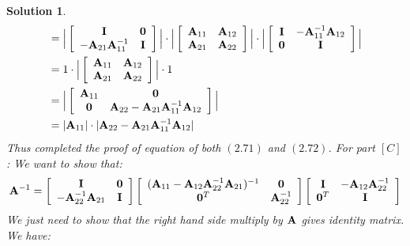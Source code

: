 \documentclass[11pt]{article}
\newtheorem{sol}{Solution}
\begin{document}
\begin{sol}
\begin{align*}
		&= \Big|\left[\begin{array}{cc} {\bf I}& {\bf 0}\\ -{\bf A}_{21}{\bf A}_{11}^{-1}& {\bf I}\end{array}\right]\Big|\cdot \Big|\left[\begin{array}{cc} {\bf A}_{11}& {\bf A}_{12}\\ {\bf A}_{21}&{\bf A}_{22} \end{array}\right]\Big|\cdot \Big|\left[\begin{array}{cc} {\bf I}& -{\bf A}_{11}^{-1}{\bf A}_{12}\\ {\bf 0}& {\bf I}\end{array}\right]\Big|\\
		&= 1\cdot \Big|\left[\begin{array}{cc} {\bf A}_{11}& {\bf A}_{12}\\ {\bf A}_{21}&{\bf A}_{22} \end{array}\right]\Big|\cdot 1\\
		&= \Big| \left[\begin{array}{cc}{\bf A}_{11}& {\bf 0}\\ {\bf 0}& {\bf A}_{22} - {\bf A}_{21}{\bf A}_{11}^{-1}{\bf A}_{12}\end{array}\right]\Big|\\
		&= |{\bf A}_{11}|\cdot |{\bf A}_{22} - {\bf A}_{21}{\bf A}_{11}^{-1}{\bf A}_{12}|
	\end{align*}
	Thus completed the proof of equation of both $(2.71)$ and $(2.72)$.\vskip 2mm
	For part $[C]$:\vskip 2mm
	We want to show that:
	\begin{align*}
		{\bf A}^{-1}= \left[\begin{array}{cc} {\bf I}& {\bf 0}\\ -{\bf A}_{22}^{-1}{\bf A}_{21} &{\bf I}  \end{array}\right]\left[\begin{array}{cc} ({\bf A}_{11}- {\bf A}_{12}{\bf A}_{22}^{-1}{\bf A}_{21})^{-1}& {\bf 0}\\ {\bf 0}^T& {\bf A}_{22}^{-1}\end{array}\right]\left[\begin{array}{cc} {\bf I}& -{\bf A}_{12}{\bf A}_{22}^{-1}\\ {\bf 0}^T& {\bf I}\end{array}\right]
	\end{align*}
	We just need to show that the right hand side multiply by ${\bf A}$ gives identity matrix.\vskip 2mm
	We have:
	\begin{align*}

\end{align*}
\end{sol}
\end{document}
